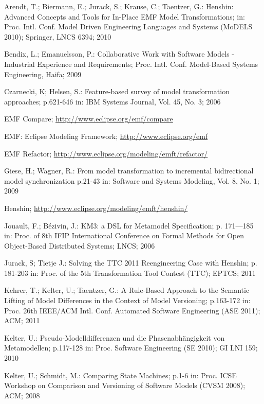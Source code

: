 \documentclass{llncs}
\begin{document}
%
%
\begin{thebibliography}{W}

 Arendt, T.; Biermann, E.;
Jurack, S.; Krause, C.; Taentzer, G.: Henshin: Advanced
Concepts and Tools for In-Place EMF Model Transformations;
in: Proc. Intl. Conf. Model Driven Engineering Languages
and Systems (MoDELS 2010); Springer, LNCS 6394;
2010

 Bendix, L.; Emanuelsson, P.:
Collaborative Work with Software Models - Industrial Experience
and Requirements; Proc. Intl. Conf. Model-Based Systems
Engineering, Haifa; 2009

Czarnecki, K; Helsen, S.:
Feature-based survey of model transformation approaches;
p.621-646 in: IBM Systems Journal, Vol. 45, No. 3; 2006

 EMF Compare;
\url{http://www.eclipse.org/emf/compare}

 EMF: Eclipse Modeling Framework;
\url{http://www.eclipse.org/emf}

 EMF Refactor;
\url{http://www.eclipse.org/modeling/emft/refactor/}

Giese, H.; Wagner, R.:
From model transformation to incremental bidirectional model synchronization
p.21-43 in: Software and Systems Modeling, Vol. 8, No. 1; 2009

 Henshin;
\url{http://www.eclipse.org/modeling/emft/henshin/}

Jouault, F.; Bézivin, J.: 
KM3: a DSL for Metamodel Specification;
p. 171—185 in: Proc. of 8th IFIP International Conference on Formal Methods for Open Object-Based Distributed Systems;
LNCS; 2006

Jurack, S; Tietje J.:
Solving the TTC 2011 Reengineering Case with Henshin;
p. 181-203 in: Proc. of the 5th Transformation Tool Contest (TTC); 
EPTCS; 2011

 Kehrer, T.; Kelter, U.;
Taentzer, G.: A Rule-Based Approach to the Semantic
Lifting of Model Differences in the Context of Model
Versioning; p.163-172 in: Proc. 26th IEEE/ACM Intl. Conf.
Automated Software Engineering (ASE 2011); ACM;
2011

 Kelter, U.:
Pseudo-Modelldifferenzen und die Phasenabhängigkeit von
Metamodellen; p.117-128 in: Proc. Software Engineering
(SE 2010); GI LNI 159; 2010

 Kelter, U.; Schmidt, M.:
Comparing State Machines; p.1-6 in: Proc. ICSE Workshop on
Comparison and Versioning of Software Models (CVSM 2008);
ACM; 2008


\end{thebibliography}
\end{document}
